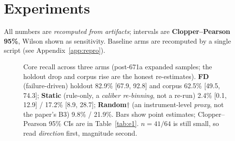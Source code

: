 \documentclass{article}
\begin{document}
\section{Experiments}
\label{sec:exp}
All numbers are \emph{recomputed from artifacts}; intervals are \textbf{Clopper--Pearson 95\%},
Wilson shown as sensitivity. Baseline arms are recomputed by a single script (see Appendix~\ref{app:repro}).

\begin{figure}[t]
\centering
{}
\caption{Core recall across three arms (post-671a expanded samples; the holdout drop and corpus
rise are the honest re-estimates). \textbf{FD} (failure-driven) holdout
82.9\% [67.9, 92.8] and corpus 62.5\% [49.5, 74.3]; \textbf{Static} (rule-only, a
\emph{caliber re-binning}, not a re-run) 2.4\% [0.1, 12.9] / 17.2\% [8.9, 28.7];
\textbf{Random$\dagger$} (an instrument-level \emph{proxy}, not the paper's B3) 9.8\% / 21.9\%.
Bars show point estimates; Clopper--Pearson 95\% CIs are in Table~\ref{tab:e1}. $n=41/64$ is
still small, so read \emph{direction} first, magnitude second.}
\label{fig:core}
\end{figure}
\end{document}
